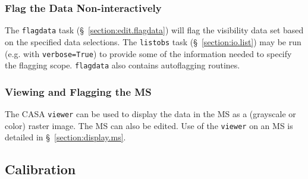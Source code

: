 \subsubsection{Flag the Data Non-interactively}
\label{section:intro.walkthru.flag.flag}

The {\tt flagdata} task (\S~\ref{section:edit.flagdata})
will flag the visibility data set based on the specified data
selections.  The {\tt listobs} task (\S~\ref{section:io.list}) may be
run (e.g. with {\tt verbose=True}) to provide some of the information
needed to specify the flagging scope. {\tt flagdata} also contains
autoflagging routines. 
 
\subsubsection{Viewing and Flagging the MS}
\label{section:intro.walkthru.flag.viewer}

The CASA {\tt viewer} can be used to display the data in the MS
as a (grayscale or color) raster image.  The MS can also be edited.
Use of the {\tt viewer} on an MS is detailed in
\S~\ref{section:display.ms}.

\subsection{Calibration}
\label{section:intro.walkthru.calib}

